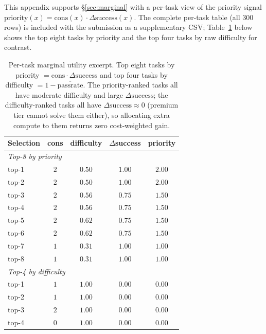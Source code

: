 \documentclass{article}
\begin{document}
This appendix supports \S\ref{sec:marginal} with a per-task view of
the priority signal
$\mathrm{priority}(x) = \mathrm{cons}(x) \cdot
\Delta\mathrm{success}(x)$. The complete per-task table (all $300$
rows) is included with the submission as a supplementary CSV;
Table~\ref{tab:marg} below shows the top eight tasks by priority and
the top four tasks by raw difficulty for contrast.

\begin{table}[h]
\centering
\caption{Per-task marginal utility excerpt. Top eight tasks by
priority $= \mathrm{cons}\cdot\Delta\mathrm{success}$ and top four
tasks by difficulty $= 1 - \overline{\mathrm{passrate}}$. The
priority-ranked tasks all have moderate difficulty and large
$\Delta\mathrm{success}$; the difficulty-ranked tasks all have
$\Delta\mathrm{success} \approx 0$ (premium tier cannot solve them
either), so allocating extra compute to them returns zero
cost-weighted gain.}
\label{tab:marg}
\small
\begin{tabular}{lcccc}
\toprule
Selection & cons & difficulty & $\Delta$success & priority \\
\midrule
\multicolumn{5}{l}{\textit{Top-8 by priority}} \\
top-1 & $2$ & $0.50$ & $1.00$ & $2.00$ \\
top-2 & $2$ & $0.50$ & $1.00$ & $2.00$ \\
top-3 & $2$ & $0.56$ & $0.75$ & $1.50$ \\
top-4 & $2$ & $0.56$ & $0.75$ & $1.50$ \\
top-5 & $2$ & $0.62$ & $0.75$ & $1.50$ \\
top-6 & $2$ & $0.62$ & $0.75$ & $1.50$ \\
top-7 & $1$ & $0.31$ & $1.00$ & $1.00$ \\
top-8 & $1$ & $0.31$ & $1.00$ & $1.00$ \\
\midrule
\multicolumn{5}{l}{\textit{Top-4 by difficulty}} \\
top-1 & $1$ & $1.00$ & $0.00$ & $0.00$ \\
top-2 & $1$ & $1.00$ & $0.00$ & $0.00$ \\
top-3 & $2$ & $1.00$ & $0.00$ & $0.00$ \\
top-4 & $0$ & $1.00$ & $0.00$ & $0.00$ \\
\bottomrule
\end{tabular}
\end{table}
\end{document}
